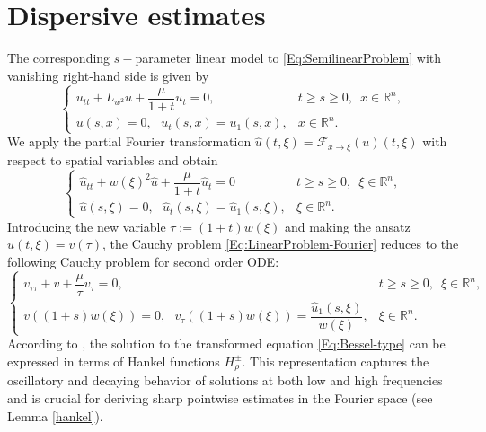 \documentclass[10pt]{article}
\newcommand{\<}{\langle}
\renewcommand{\>}{\rangle}
\numberwithin{equation}{section}
\begin{document}
\section{Dispersive estimates}
The corresponding $s-$parameter linear model to \eqref{Eq:SemilinearProblem} with vanishing right-hand side is given by
\begin{equation}\label{Eq:LinearProblem}
\begin{cases}
u_{tt} + L_{w^2}u + \dfrac{\mu}{1+t}u_t = 0, & t\geq s\geq 0,\,\,\, x\in\mathbb{R}^n,\\
u(s,x) = 0, \,\,\,\, u_t(s,x) = u_1(s,x), & x\in\mathbb{R}^n.
\end{cases}
\end{equation}
We apply the partial Fourier transformation $\hat{u}(t,\xi)=\mathcal{F}_{x\to\xi}(u)(t,\xi)$ with respect to spatial variables and obtain
\begin{equation}\label{Eq:LinearProblem-Fourier}
\begin{cases}
\widehat{u}_{tt} + w(\xi)^2\widehat{u} + \dfrac{\mu}{1+t}\widehat{u}_t = 0 & t\geq s\geq 0,\,\,\, \xi\in\mathbb{R}^n,\\
\widehat{u}(s,\xi) = 0, \,\,\,\, \widehat{u}_t(s,\xi) = \widehat{u}_1(s,\xi), &  \xi\in\mathbb{R}^n.
\end{cases}
\end{equation}
Introducing the new variable $\tau:=(1+t)w(\xi)$ and making the ansatz $\widehat{u}(t,\xi)=v(\tau)$, the Cauchy problem \eqref{Eq:LinearProblem-Fourier} reduces to the following Cauchy problem for second order ODE:
\begin{equation} \label{Eq:Bessel-type}
\begin{cases}
v_{\tau\tau} + v + \dfrac{\mu}{\tau}v_\tau = 0, & t\geq s\geq 0,\,\,\, \xi\in\mathbb{R}^n,\\
v((1+s)w(\xi)) = 0, \,\,\,\, v_\tau((1+s)w(\xi)) = \dfrac{\hat{u}_1(s,\xi)}{w(\xi)}, & \xi\in\mathbb{R}^n.
\end{cases}
\end{equation}
According to \cite{Wirth=2004}, the solution to the transformed equation \eqref{Eq:Bessel-type} can be expressed in terms of Hankel functions $H^{\pm}_{\rho}$. This representation captures the oscillatory and decaying behavior of solutions at both low and high frequencies and is crucial for deriving sharp pointwise estimates in the Fourier space (see Lemma \ref{hankel}).
%
\end{document}

